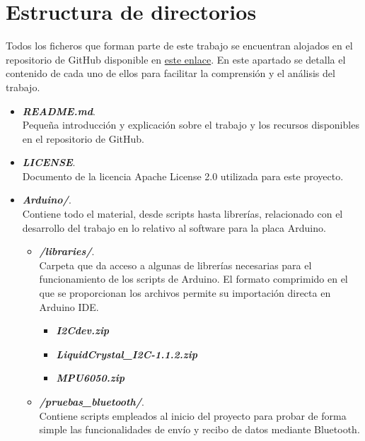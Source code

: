 
\section{Estructura de directorios}

Todos los ficheros que forman parte de este trabajo se encuentran alojados en el repositorio de GitHub disponible en \href{https://github.com/imb1006/Web_Seguimiento_Parkinson}{este enlace}. En este apartado se detalla el contenido de cada uno de ellos para facilitar la comprensión y el análisis del trabajo.

\begin{itemize}
    \item \textbf{\textit{README.md}}.\\
    Pequeña introducción y explicación sobre el trabajo y los recursos disponibles en el repositorio de GitHub.
    \item \textbf{\textit{LICENSE}}.\\
    Documento de la licencia Apache License 2.0 utilizada para este proyecto.
    \item \textbf{\textit{Arduino/}}.\\
    Contiene todo el material, desde scripts hasta librerías, relacionado con el desarrollo del trabajo en lo relativo al software para la placa Arduino.
    \begin{itemize}
        \item \textbf{\textit{/libraries/}}.\\
        Carpeta que da acceso a algunas de librerías necesarias para el funcionamiento de los scripts de Arduino. El formato comprimido en el que se proporcionan los archivos permite su importación directa en Arduino IDE.
        \begin{itemize}
            \item \textbf{\textit{I2Cdev.zip}}
            \item \textbf{\textit{LiquidCrystal\_I2C-1.1.2.zip}}
            \item \textbf{\textit{MPU6050.zip}}
        \end{itemize}
        \item \textbf{\textit{/pruebas\_bluetooth/}}.\\
        Contiene scripts empleados al inicio del proyecto para probar de forma simple las funcionalidades de envío y recibo de datos mediante Bluetooth.

\end{itemize}
\end{itemize}

